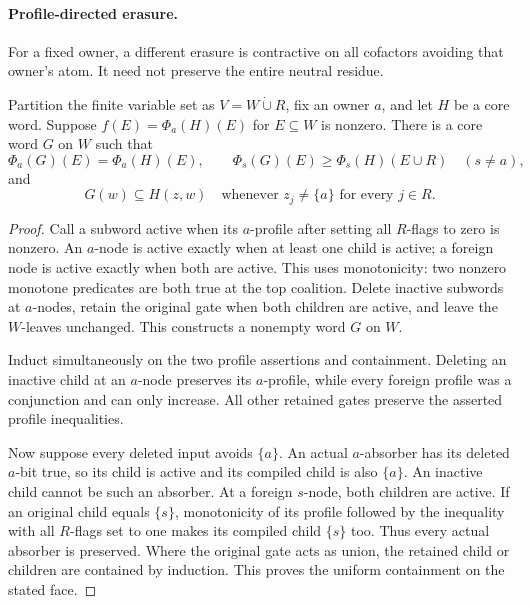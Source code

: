 \paragraph{Profile-directed erasure.}
For a fixed owner, a different erasure is contractive on all cofactors
avoiding that owner's atom. It need not preserve the entire neutral residue.

\begin{lemma}
\label{core:lem:owner-face-erasure}
Partition the finite variable set as $V=W\mathbin{\dot\cup}R$, fix an owner $a$,
and let $H$ be a core word. Suppose
$f(E)=\Phi_a(H)(E)$ for $E\subseteq W$ is nonzero.
There is a core word $G$ on $W$ such that
\[
 \Phi_a(G)(E)=\Phi_a(H)(E),\qquad
 \Phi_s(G)(E)\geq\Phi_s(H)(E\cup R)\quad(s\ne a),
\]
and
\[
 G(w)\subseteq H(z,w)
 \quad\text{whenever }z_j\ne\{a\}\text{ for every }j\in R.
\]
\end{lemma}
\begin{proof}
Call a subword active when its $a$-profile after setting all $R$-flags
to zero is nonzero. An $a$-node is active exactly when at least one child
is active; a foreign node is active exactly when both are active.
This uses monotonicity: two nonzero monotone predicates are both true at
the top coalition. Delete inactive subwords at $a$-nodes, retain the
original gate when both children are active, and leave the $W$-leaves
unchanged. This constructs a nonempty word $G$ on $W$.

Induct simultaneously on the two profile assertions and containment.
Deleting an inactive child at an $a$-node preserves its $a$-profile,
while every foreign profile was a conjunction and can only increase.
All other retained gates preserve the asserted profile inequalities.

Now suppose every deleted input avoids $\{a\}$. An actual $a$-absorber
has its deleted $a$-bit true, so its child is active and its compiled child
is also $\{a\}$. An inactive child cannot be such an absorber.
At a foreign $s$-node, both children are active. If an original child
equals $\{s\}$, monotonicity of its profile followed by the inequality
with all $R$-flags set to one makes its compiled child $\{s\}$ too.
Thus every actual absorber is preserved. Where the original gate acts
as union, the retained child or children are contained by induction.
This proves the uniform containment on the stated face.
\end{proof}

